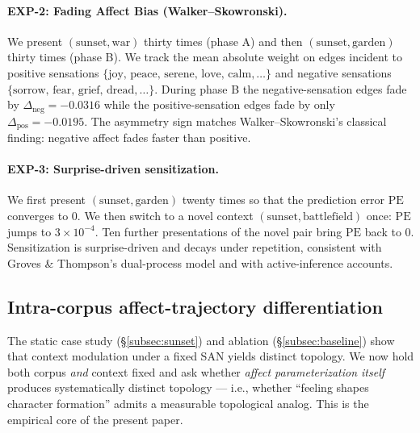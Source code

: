 \documentclass{article}
\begin{document}
\paragraph{EXP-2: Fading Affect Bias (Walker--Skowronski).} We present
$(\text{sunset}, \text{war})$ thirty times (phase A) and then
$(\text{sunset}, \text{garden})$ thirty times (phase B). We track the mean
absolute weight on edges incident to positive sensations
$\{\text{joy, peace, serene, love, calm}, \ldots\}$ and negative sensations
$\{\text{sorrow, fear, grief, dread}, \ldots\}$. During phase B the
negative-sensation edges fade by $\Delta_{\text{neg}} = -0.0316$ while the
positive-sensation edges fade by only
$\Delta_{\text{pos}} = -0.0195$. The asymmetry sign matches
Walker--Skowronski's classical finding: negative affect fades faster than
positive.

\paragraph{EXP-3: Surprise-driven sensitization.} We first present
$(\text{sunset}, \text{garden})$ twenty times so that the prediction error
$\mathrm{PE}$ converges to $0$. We then switch to a novel context
$(\text{sunset}, \text{battlefield})$ once: $\mathrm{PE}$ jumps to
$3 \times 10^{-4}$. Ten further presentations of the novel pair bring
$\mathrm{PE}$ back to $0$. Sensitization is surprise-driven and decays
under repetition, consistent with Groves \& Thompson's dual-process model
and with active-inference accounts.

\subsection{Intra-corpus affect-trajectory differentiation}
\label{subsec:affect_trajectory}

The static case study (\S\ref{subsec:sunset}) and ablation
(\S\ref{subsec:baseline}) show that context modulation under a fixed SAN
yields distinct topology. We now hold both corpus \emph{and} context fixed
and ask whether \emph{affect parameterization itself} produces
systematically distinct topology --- i.e., whether ``feeling shapes
character formation'' \cite{panksepp2012archaeology, damasio1999feeling}
admits a measurable topological analog. This is the empirical core of the
present paper.
\end{document}
